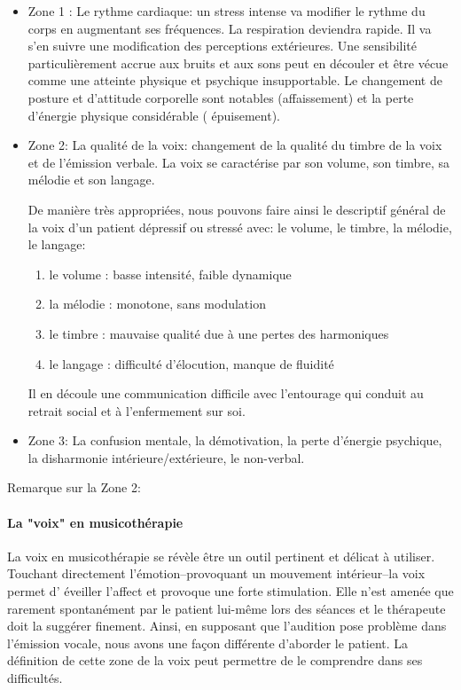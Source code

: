 \begin{itemize}
  	\item Zone 1 :  Le rythme cardiaque: un stress intense va modifier le rythme
  du corps en augmentant ses fréquences. La respiration deviendra
  rapide. Il va s'en suivre une modification des perceptions
  extérieures. Une sensibilité particulièrement accrue aux bruits et
  aux sons peut en découler et être vécue comme une
  atteinte physique et psychique insupportable.
  Le changement de posture et d'attitude corporelle sont
notables (affaissement) et la perte d'énergie physique considérable ( épuisement).


 	\item Zone 2: La qualité de la voix: changement de la qualité du timbre de la
 voix et de l'émission verbale.
  La voix se caractérise par son volume, son timbre, sa mélodie et son langage. 
 	
 	De manière très appropriées, nous pouvons faire ainsi le
        descriptif général de la voix d'un patient dépressif ou
        stressé avec: le volume, le timbre, la
        mélodie, le langage: 
 	\begin{enumerate}
 		\item le volume : basse intensité, faible dynamique
 		\item la mélodie : monotone, sans modulation
 		\item le timbre : mauvaise qualité due à une pertes des harmoniques
 		\item le langage : difficulté d'élocution, manque de fluidité
 	\end{enumerate}
        Il en découle une communication difficile avec l'entourage qui  conduit au retrait social et à l'enfermement sur soi.
        
	\item Zone 3: La confusion mentale, la démotivation, la perte d'énergie
psychique, la disharmonie intérieure/extérieure, le non-verbal.
\end{itemize}

Remarque sur la Zone 2: \paragraph{La "voix" en musicothérapie}

La voix en musicothérapie se révèle être un outil pertinent et délicat
à utiliser. Touchant 
directement 
l'émotion--provoquant un mouvement intérieur--la voix permet d'
éveiller l'affect
et provoque une forte stimulation. Elle n'est amenée que rarement
spontanément par le patient lui-même lors des séances et le thérapeute doit la suggérer
finement.
Ainsi, en supposant que l'audition pose problème dans l'émission
vocale, nous avons une façon différente d'aborder le patient. La
définition de cette
zone de la voix peut permettre de le comprendre dans ses difficultés. 

